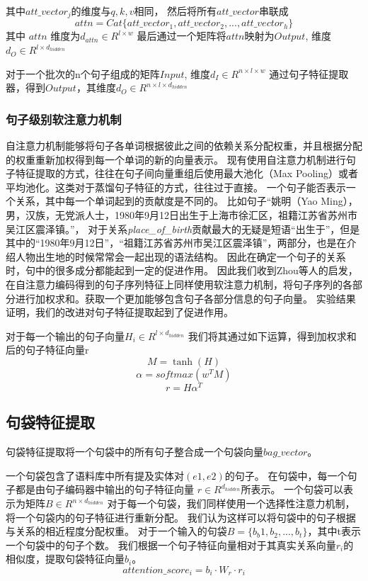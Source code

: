 \documentclass[UTF8]{csoarticle}
\begin{document}
其中$att\_vector_j$的维度与$q, k, v$相同，
然后将所有$att\_vector$串联成
\[attn = Cat\{att\_vector_1,att\_vector_2,...,att\_vector_h\}\]
其中 $attn$ 维度为$d_{attn} \in R^{l\times w}$
最后通过一个矩阵将$attn$映射为$Output$, 维度$d_{O} \in R^{l\times d_{hidden}}$

对于一个批次的n个句子组成的矩阵$Input$, 维度$d_{I} \in R^{n\times l\times w}$
通过句子特征提取器，得到$Output$，其维度$d_{O} \in R^{n\times l\times  d_{hidden}}$

\subsubsection{句子级别软注意力机制}
自注意力机制能够将句子各单词根据彼此之间的依赖关系分配权重，并且根据分配的权重重新加权得到每一个单词的新的向量表示。
现有使用自注意力机制进行句子特征提取的方式，往往在句子间向量重组后使用最大池化（Max Pooling）或者平均池化。这类对于蒸馏句子特征的方式，往往过于直接。
一个句子能否表示一个关系，其中每一个单词起到的贡献度是不同的。
比如句子“姚明（Yao Ming），男，汉族，无党派人士，1980年9月12日出生于上海市徐汇区，祖籍江苏省苏州市吴江区震泽镇。”，
对于关系\textit{place\_of\_birth}贡献最大的无疑是短语“出生于”，但是其中的“1980年9月12日”，“祖籍江苏省苏州市吴江区震泽镇”，两部分，也是在介绍人物出生地的时候常常会一起出现的语法结构。
因此在确定一个句子的关系时，句中的很多成分都能起到一定的促进作用。
因此我们收到Zhou\cite{bib7}等人的启发，在自注意力编码得到的句子序列特征上同样使用软注意力机制，将句子序列的各部分进行加权求和。获取一个更加能够包含句子各部分信息的句子向量。
实验结果证明，我们的改进对句子特征提取起到了促进作用。

对于每一个输出的句子向量$ H_i \in R^{l \times d_{hidden}} $
我们将其通过如下运算，得到加权求和后的句子特征向量r
\[ M= \tanh(H) \]
\[ \alpha = softmax(w^T M) \]
\[ r = H \alpha^T \]

\subsection{句袋特征提取}
句袋特征提取将一个句袋中的所有句子整合成一个句袋向量$bag\_vector$。

一个句袋包含了语料库中所有提及实体对$(e1, e2)$的句子。
在句袋中，每一个句子都是由句子编码器中输出的句子特征向量 $r \in R^{d_{hidden}}$所表示。
一个句袋可以表示为矩阵$B \in R^{n \times d_{hidden}}$
对于每一个句袋，我们同样使用一个选择性注意力机制，将一个句袋内的句子特征进行重新分配。
我们认为这样可以将句袋中的句子根据与关系的相近程度分配权重。
对于一个输入的句袋$B = \{b_b1, b_2,...,b_t\}$，其中t表示一个句袋中的句子个数。
我们根据一个句子特征向量相对于其真实关系向量$r_i$的相似度，提取句袋特征向量$b_i$。
\[attention\_score_i =  b_i\cdot W_r \cdot r_i\]
\end{document}
